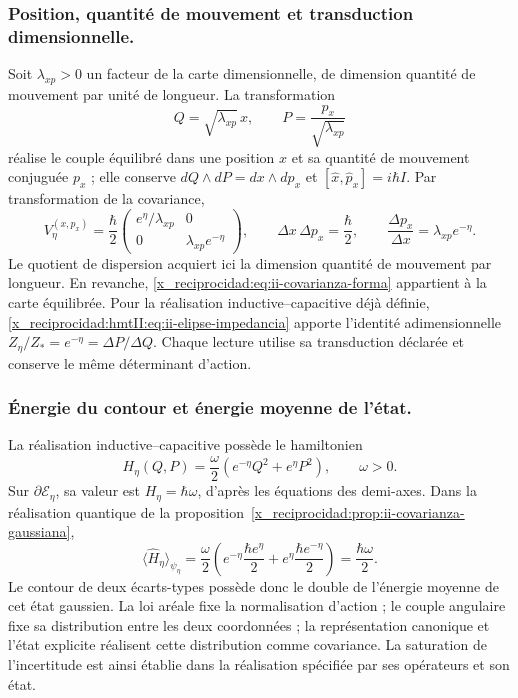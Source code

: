 \subsubsection{Position, quantité de mouvement et transduction dimensionnelle.}
Soit \(\lambda_{xp}>0\) un facteur de la carte dimensionnelle, de dimension
quantité de mouvement par unité de longueur. La transformation
\[
 Q=\sqrt{\lambda_{xp}}\,x,\qquad
 P=\frac{p_x}{\sqrt{\lambda_{xp}}}
\]
réalise le couple équilibré dans une position \(x\) et sa quantité de mouvement conjuguée
\(p_x\) ; elle conserve \(dQ\wedge dP=dx\wedge dp_x\) et
\([\widehat x,\widehat p_x]=i\hbar I\). Par transformation de la
covariance,
\begin{equation}
 V_\eta^{(x,p_x)}=\frac{\hbar}{2}
 \begin{pmatrix}e^\eta/\lambda_{xp}&0\\
                 0&\lambda_{xp}e^{-\eta}\end{pmatrix},\qquad
 \Delta x\,\Delta p_x=\frac{\hbar}{2},\qquad
 \frac{\Delta p_x}{\Delta x}=\lambda_{xp}e^{-\eta}.
 \label{x_reciprocidad:eq:ii-covarianza-dimensiones}
\end{equation}
Le quotient de dispersion acquiert ici la dimension quantité de mouvement par longueur.
En revanche, \eqref{x_reciprocidad:eq:ii-covarianza-forma} appartient à la carte équilibrée.
Pour la réalisation inductive--capacitive déjà définie,
\eqref{x_reciprocidad:hmtII:eq:ii-elipse-impedancia} apporte l'identité adimensionnelle
\(Z_\eta/Z_*=e^{-\eta}=\Delta P/\Delta Q\).
Chaque lecture utilise sa transduction déclarée et conserve le même
déterminant d'action.

\subsubsection{Énergie du contour et énergie moyenne de l'état.}
La réalisation inductive--capacitive possède le hamiltonien
\[
 H_\eta(Q,P)=\frac{\omega}{2}
 \left(e^{-\eta}Q^2+e^\eta P^2\right),\qquad \omega>0.
\]
Sur \(\partial\mathcal E_\eta\), sa valeur est
\(H_\eta=\hbar\omega\), d'après les équations des demi-axes. Dans la
réalisation quantique de la proposition~\ref{x_reciprocidad:prop:ii-covarianza-gaussiana},
\begin{equation}
 \langle\widehat H_\eta\rangle_{\psi_\eta}
 =\frac{\omega}{2}
 \left(e^{-\eta}\frac{\hbar e^\eta}{2}
       +e^\eta\frac{\hbar e^{-\eta}}{2}\right)
 =\frac{\hbar\omega}{2}.
 \label{x_reciprocidad:eq:ii-energia-contorno-covarianza}
\end{equation}
Le contour de deux écarts-types possède donc le double de
l'énergie moyenne de cet état gaussien. La loi aréale fixe la normalisation
d'action ; le couple angulaire fixe sa distribution entre les deux coordonnées ;
la représentation canonique et l'état explicite réalisent cette distribution
comme covariance. La saturation de l'incertitude est ainsi établie dans
la réalisation spécifiée par ses opérateurs et son état.


